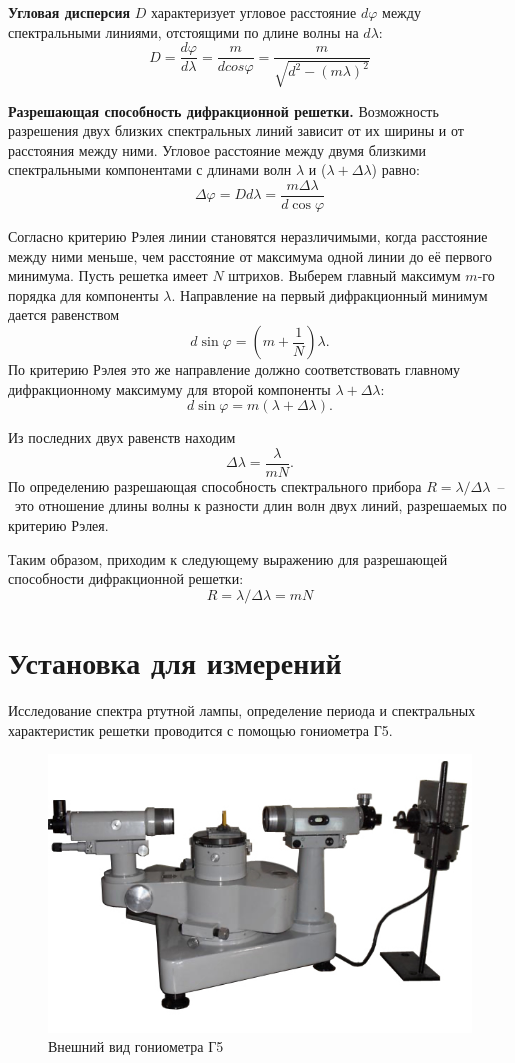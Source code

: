 \documentclass{letask}
\begin{document}
\textbf{Угловая дисперсия} $D$ характеризует угловое расстояние $d \varphi$ между спектральными линиями, отстоящими по длине волны на $d \lambda$:
\[
D=\dfrac{d \varphi}{d \lambda}=\frac{m}{d cos \varphi}=\dfrac{m}{\sqrt{d^{2}-(m \lambda)^{2}}}
\]

\textbf{Разрешающая способность дифракционной решетки.} Возможность разрешения двух близких спектральных линий зависит от их ширины и от расстояния между ними. Угловое расстояние между двумя близкими спектральными компонентами с длинами волн $\lambda$ и ($\lambda + \Delta \lambda$) равно:
\[
\Delta \varphi =  D d \lambda = \frac{m \Delta \lambda}{d \cos{\varphi}} 
\]

Согласно критерию Рэлея линии становятся неразличимыми, когда расстояние между ними меньше, чем расстояние от максимума одной линии до её первого минимума. Пусть решетка имеет $N$ штрихов. Выберем главный максимум $m$-го порядка для компоненты $\lambda$. Направление на первый дифракционный минимум дается равенством 
\[ d \sin \varphi = \left( m + \dfrac{1}{N} \right) \lambda. \]
По критерию Рэлея это же направление должно соответствовать главному дифракционному максимуму для второй компоненты $\lambda + \Delta \lambda$:
\[ d \sin \varphi = m (\lambda + \Delta \lambda) .\]

Из последних двух равенств находим 
\[\Delta \lambda = \dfrac{\lambda}{mN}.\]
По определению разрешающая способность спектрального прибора $R = \lambda / \Delta \lambda$~--~это отношение длины волны к разности длин волн двух линий, разрешаемых по критерию Рэлея.

Таким образом, приходим к следующему выражению для разрешающей способности дифракционной решетки:
\[R = \lambda / \Delta \lambda = mN\]

\section{Установка для измерений}

Исследование спектра ртутной лампы, определение периода и спектральных характеристик решетки проводится с помощью гониометра Г5.

\begin{figure}[H]
\centering
	\includegraphics[width = 0.7\lw]{g5}
	\caption{Внешний вид гониометра Г5}
	\label{fig:g5}
\end{figure}
\end{document}
